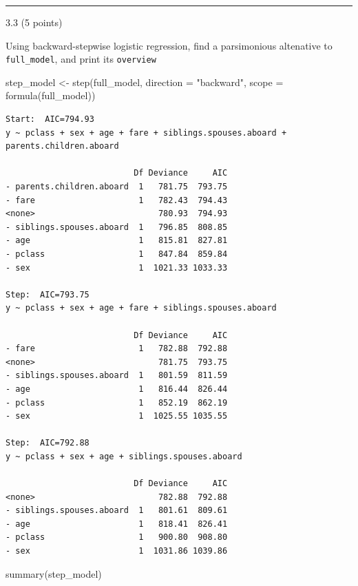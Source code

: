 \documentclass[
  letterpaper,
  DIV=11,
  numbers=noendperiod]{scrartcl}
\newenvironment{Shaded}{\begin{snugshade}}{\end{snugshade}}
\newcommand{\AttributeTok}[1]{\textcolor[rgb]{0.40,0.45,0.13}{#1}}
\newcommand{\FunctionTok}[1]{\textcolor[rgb]{0.28,0.35,0.67}{#1}}
\newcommand{\NormalTok}[1]{\textcolor[rgb]{0.00,0.23,0.31}{#1}}
\newcommand{\OtherTok}[1]{\textcolor[rgb]{0.00,0.23,0.31}{#1}}
\newcommand{\StringTok}[1]{\textcolor[rgb]{0.13,0.47,0.30}{#1}}
\begin{document}
\begin{center}\rule{0.5\linewidth}{0.5pt}\end{center}

3.3 (5 points)

Using backward-stepwise logistic regression, find a parsimonious
altenative to \texttt{full\_model}, and print its \texttt{overview}

\begin{Shaded}
\begin{Highlighting}[]
\NormalTok{step\_model }\OtherTok{\textless{}{-}} \FunctionTok{step}\NormalTok{(full\_model, }\AttributeTok{direction =} \StringTok{"backward"}\NormalTok{, }\AttributeTok{scope =} \FunctionTok{formula}\NormalTok{(full\_model))}
\end{Highlighting}
\end{Shaded}

\begin{verbatim}
Start:  AIC=794.93
y ~ pclass + sex + age + fare + siblings.spouses.aboard + parents.children.aboard

                          Df Deviance     AIC
- parents.children.aboard  1   781.75  793.75
- fare                     1   782.43  794.43
<none>                         780.93  794.93
- siblings.spouses.aboard  1   796.85  808.85
- age                      1   815.81  827.81
- pclass                   1   847.84  859.84
- sex                      1  1021.33 1033.33

Step:  AIC=793.75
y ~ pclass + sex + age + fare + siblings.spouses.aboard

                          Df Deviance     AIC
- fare                     1   782.88  792.88
<none>                         781.75  793.75
- siblings.spouses.aboard  1   801.59  811.59
- age                      1   816.44  826.44
- pclass                   1   852.19  862.19
- sex                      1  1025.55 1035.55

Step:  AIC=792.88
y ~ pclass + sex + age + siblings.spouses.aboard

                          Df Deviance     AIC
<none>                         782.88  792.88
- siblings.spouses.aboard  1   801.61  809.61
- age                      1   818.41  826.41
- pclass                   1   900.80  908.80
- sex                      1  1031.86 1039.86
\end{verbatim}

\begin{Shaded}
\begin{Highlighting}[]
\FunctionTok{summary}\NormalTok{(step\_model)}
\end{Highlighting}
\end{Shaded}
\end{document}
